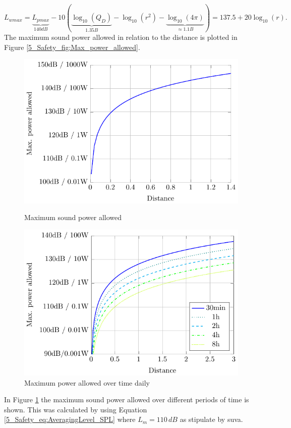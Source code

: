 \begin{equation}
         L_{wmax} 
     = 
     \underbrace{L_{pmax}}_{140dB} - 10\left ( \underbrace{\log_{10}(Q_D)}_{1.35B} - \log_{10}(r^2) - \underbrace{\log_{10}(4\pi)}_{\approx 1.1B}  \right ) = 137.5 + 20\log_{10}(r).
\end{equation}
The maximum sound power allowed in relation to the distance is plotted in Figure \ref{5_Safety_fig:Max_power_allowed}.
\begin{figure}
    \begin{minipage}{0.49\textwidth}
        \centering
        \includegraphics[width=\textwidth]{images/5_Safety_Risks/Max_Power_Allowed.pdf}
        \caption{Maximum sound power allowed}
        \label{5_Safety_fig:Max_power_allowed}
        \end{minipage}
    \begin{minipage}{0.49\textwidth}
        \centering
        \includegraphics[width=\textwidth]{images/5_Safety_Risks/Max_Power_Allowed_Time.pdf}
        \caption{Maximum power allowed over time daily}
        \label{5_Safety_fig:Max_power_allowed:daily}
    \end{minipage}
\end{figure}
In Figure \ref{5_Safety_fig:Max_power_allowed:daily} the maximum sound power allowed over different periods of time is shown. This was calculated by using Equation \ref{5_Safety_eq:AveragingLevel_SPL} where $L_m = 110\,dB$ as stipulate by \acrshort{suva}.  

